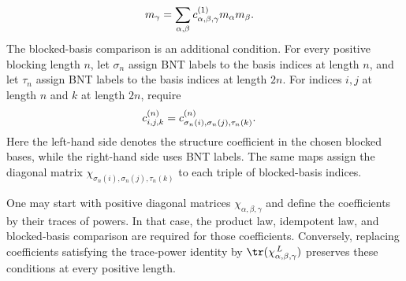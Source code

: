 \begin{definition}
\begin{align}
        m_\gamma
         & =\sum_{\alpha,\beta}
        c^{(1)}_{\alpha,\beta,\gamma}m_\alpha m_\beta.
        \notag
    \end{align}
    The blocked-basis comparison is an additional condition.
    For every positive blocking length $n$, let $\sigma_n$ assign BNT
    labels to the basis indices at length $n$, and let $\tau_n$ assign
    BNT labels to the basis indices at length $2n$.
    For indices $i,j$ at length $n$ and $k$ at length $2n$, require
    \begin{align}
        c^{(n)}_{i,j,k}
         & =c^{(n)}_{\sigma_n(i),\sigma_n(j),\tau_n(k)}.
        \notag
    \end{align}
    Here the left-hand side denotes the structure coefficient in the chosen
    blocked bases, while the right-hand side uses BNT labels.
    The same maps assign the diagonal matrix
    $\chi_{\sigma_n(i),\sigma_n(j),\tau_n(k)}$ to each triple of
    blocked-basis indices.

    One may start with positive diagonal matrices $\chi_{\alpha,\beta,\gamma}$
    and define the coefficients by their traces of powers. In that case,
    the product law, idempotent law, and blocked-basis comparison are
    required for those coefficients. Conversely, replacing coefficients
    satisfying the trace-power identity by
    $\tr(\chi_{\alpha,\beta,\gamma}^{\,L})$ preserves these conditions at
    every positive length.
\end{definition}

